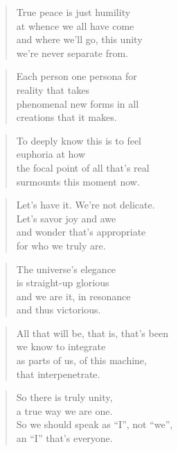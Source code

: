 \documentclass[10pt,a4paper]{article}
\begin{document}
\begin{paracol}{2}
\begin{verse}
True peace is just humility\\
at whence we all have come\\
and where we’ll go, this unity\\
we’re never separate from.
\end{verse}

\begin{verse}
Each person one persona for\\
reality that takes\\
phenomenal new forms in all\\
creations that it makes.
\end{verse}

\begin{verse}
To deeply know this is to feel\\
euphoria at how\\
the focal point of all that’s real\\
surmounts this moment now.
\end{verse}

\begin{verse}
Let’s have it. We’re not delicate.\\
Let’s savor joy and awe\\
and wonder that’s appropriate\\
for who we truly are.
\end{verse}

\begin{verse}
The universe’s elegance\\
is straight-up glorious\\
and we are it, in resonance\\
and thus victorious.
\end{verse}

\begin{verse}
All that will be, that is, that’s been\\
we know to integrate\\
as parts of us, of this machine,\\
that interpenetrate.
\end{verse}

\begin{verse}
So there is truly unity,\\
a true way we are one.\\
So we should speak as “I”, not “we”,\\
an “I” that’s everyone.
\end{verse}


\end{paracol}
\end{document}
